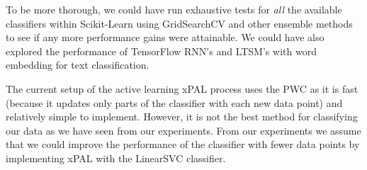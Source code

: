 To be more thorough, we could have run exhaustive tests for \textit{all} the available classifiers within Scikit-Learn using GridSearchCV and other ensemble methods to see if any more performance gains were attainable. We could have also explored the performance of TensorFlow RNN's and LTSM's with word embedding for text classification.

The current setup of the active learning xPAL process uses the PWC as it is fast (because it updates only parts of the classifier with each new data point) and relatively simple to implement. However, it is not the best method for classifying our data as we have seen from our experiments. From our experiments we assume that we could improve the performance of the classifier with fewer data points by implementing xPAL with the LinearSVC classifier.

